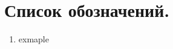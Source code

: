 \documentclass[document.tex]{subfiles}
\begin{document}
\section*{Список обозначений.}
\begin{enumerate}
\item exmaple
\end{enumerate}
\end{document}
